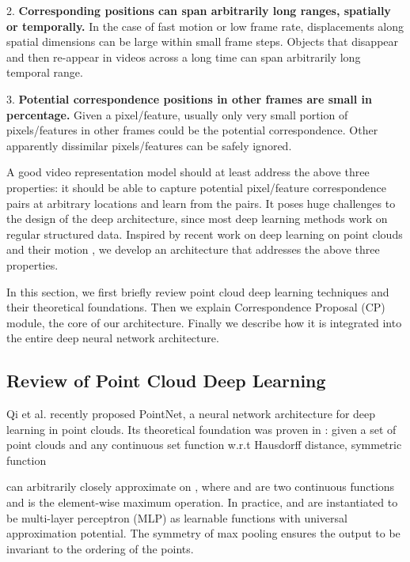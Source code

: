 \documentclass[10pt,twocolumn,letterpaper]{article}
\begin{document}
2. \textbf{Corresponding positions can span arbitrarily long ranges, spatially or temporally.} In the case of fast motion or low frame rate, displacements along spatial dimensions can be large within small frame steps. Objects that disappear and then re-appear in videos across a long time can span arbitrarily long temporal range. 

3. \textbf{Potential correspondence positions in other frames are small in percentage.} 
Given a pixel/feature, usually only very small portion of pixels/features in other frames could be the potential correspondence. 
Other apparently dissimilar pixels/features can be safely ignored. 



A good video representation model should at least address the above three properties: it should be able to capture potential pixel/feature correspondence pairs at arbitrary locations and learn from the pairs. It poses huge challenges to the design of the deep architecture, since most deep learning methods work on regular structured data. Inspired by recent work on deep learning on point clouds \cite{PointNet,PointNet++,Dynamic:Graph:CNN} and their motion \cite{FlowNet3D}, we develop an architecture that addresses the above three properties. 

In this section, we first briefly review point cloud deep learning techniques and their theoretical foundations. Then we explain Correspondence Proposal (CP) module, the core of our architecture. Finally we describe how it is integrated into the entire deep neural network architecture. 



\subsection{Review of Point Cloud Deep Learning}

Qi et al. \cite{PointNet} recently proposed PointNet, a neural network architecture for deep learning in point clouds. 
Its theoretical foundation was proven in \cite{PointNet}: given 
a set of point clouds 
and any continuous set function   w.r.t Hausdorff distance, symmetric function     

can arbitrarily closely approximate  on , where   and  are two continuous functions and  is the element-wise maximum operation. In practice,  and  are instantiated to be multi-layer perceptron (MLP) as learnable functions with universal approximation potential. The symmetry of max pooling ensures the output to be invariant to the ordering of the points.
\end{document}
